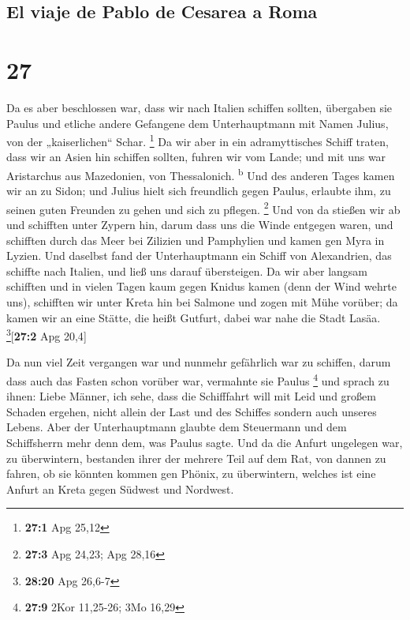 \hypertarget{el-viaje-de-pablo-de-cesarea-a-roma}{%
\subsection{El viaje de Pablo de Cesarea a
Roma}\label{el-viaje-de-pablo-de-cesarea-a-roma}}

\hypertarget{section-26}{%
\section{27}\label{section-26}}

 Da es aber beschlossen war, dass wir nach Italien
schiffen sollten, übergaben sie Paulus und etliche andere Gefangene dem
Unterhauptmann mit Namen Julius, von der „kaiserlichen`` Schar.
\footnote{\textbf{27:1} Apg 25,12}  Da wir aber in ein
adramyttisches Schiff traten, dass wir an Asien hin schiffen sollten,
fuhren wir vom Lande; und mit uns war Aristarchus aus Mazedonien, von
Thessalonich. \textsuperscript{b}  Und des anderen Tages
kamen wir an zu Sidon; und Julius hielt sich freundlich gegen Paulus,
erlaubte ihm, zu seinen guten Freunden zu gehen und sich zu pflegen.
\footnote{\textbf{27:3} Apg 24,23; Apg 28,16}  Und von da
stießen wir ab und schifften unter Zypern hin, darum dass uns die Winde
entgegen waren,  und schifften durch das Meer bei Zilizien
und Pamphylien und kamen gen Myra in Lyzien.  Und daselbst
fand der Unterhauptmann ein Schiff von Alexandrien, das schiffte nach
Italien, und ließ uns darauf übersteigen.  Da wir aber
langsam schifften und in vielen Tagen kaum gegen Knidus kamen (denn der
Wind wehrte uns), schifften wir unter Kreta hin bei Salmone
 und zogen mit Mühe vorüber; da kamen wir an eine Stätte,
die heißt Gutfurt, dabei war nahe die Stadt Lasäa.
\footnote{\textbf{28:20} Apg 26,6-7}{[}\textbf{27:2} Apg 20,4{]}

 Da nun viel Zeit vergangen war und nunmehr gefährlich war
zu schiffen, darum dass auch das Fasten schon vorüber war, vermahnte sie
Paulus \footnote{\textbf{27:9} 2Kor 11,25-26; 3Mo 16,29} 
und sprach zu ihnen: Liebe Männer, ich sehe, dass die Schifffahrt will
mit Leid und großem Schaden ergehen, nicht allein der Last und des
Schiffes sondern auch unseres Lebens.  Aber der
Unterhauptmann glaubte dem Steuermann und dem Schiffsherrn mehr denn
dem, was Paulus sagte.  Und da die Anfurt ungelegen war,
zu überwintern, bestanden ihrer der mehrere Teil auf dem Rat, von dannen
zu fahren, ob sie könnten kommen gen Phönix, zu überwintern, welches ist
eine Anfurt an Kreta gegen Südwest und Nordwest.

